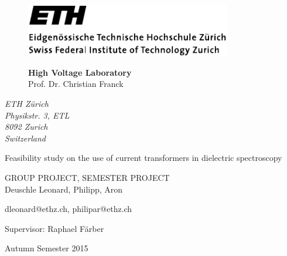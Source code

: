 


\pagestyle{empty}

\begin{figure}
    \begin{minipage}[b]{0.5\linewidth}
        \includegraphics[width=0.8\textwidth]{figures/ethlogo}
    \end{minipage}
    \hfill
    \begin{minipage}[b]{0.45\linewidth}
        \flushright
        \textbf{High Voltage Laboratory}\\
        \vspace{3mm}
        Prof. Dr. Christian Franck
    \end{minipage}
\end{figure}


\begin{flushright}
    \textit{ETH Z\"urich\\
    Physikstr. 3, ETL\\
    8092 Zurich\\
    Switzerland}
\end{flushright}

\phantom{u}
\vspace{1.5cm}
\Huge{\sc Feasibility study on the use of current transformers in dielectric spectroscopy}
\vspace{1.5cm}

\Large
GROUP PROJECT, SEMESTER PROJECT\\

\vspace*{5cm} \large
Deuschle Leonard, Philipp, Aron

dleonard@ethz.ch, philipar@ethz.ch

\normalsize

\vspace{1.5cm}

Supervisor: Raphael F\"arber

Autumn Semester 2015